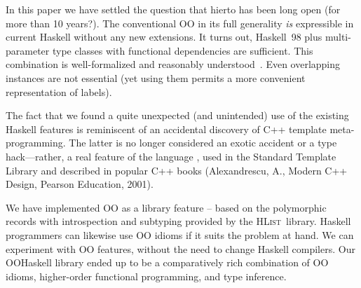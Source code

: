 \documentclass{jfp}
\newcommand{\HList}{\textsc{HList}}
\begin{document}
In this paper we have settled the question that hierto has been long
open (for more than 10 years?).
The conventional OO in its full generality \emph{is} expressible in
current Haskell without any new extensions. It turns out, Haskell~98
plus multi-parameter type classes with functional dependencies are
sufficient. This combination is well-formalized and reasonably
understood~\cite{SS04}. Even overlapping instances are not essential
(yet using them permits a more convenient representation of labels).

The fact that we found a quite unexpected (and unintended) use of the
existing Haskell features is reminiscent of an accidental discovery of
C++ template meta-programming. The latter is no longer considered
an exotic accident or a type hack---rather, a real feature of the
language \cite{DSL-in-three-lang}, used in the Standard Template
Library and described in popular C++ books (Alexandrescu, A., Modern
C++ Design, Pearson Education, 2001).

We have implemented OO as a library feature -- based on the
polymorphic records with introspection and subtyping provided by the
\HList\ library. Haskell programmers can likewise use OO idioms if it
suits the problem at hand. We can experiment with OO features, without
the need to change Haskell compilers. Our OOHaskell library ended up
to be a comparatively rich combination of OO idioms, higher-order
functional programming, and type inference.
\end{document}
